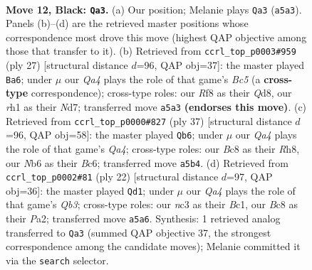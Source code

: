 \documentclass[11pt]{article}
\begin{document}
\clearpage

\begin{figure}[p]\centering
\begin{subfigure}{0.46\textwidth}\centering
\resizebox{\linewidth}{!}{%
\newchessgame
\chessboard[
  setfen={rnb2rk1/ppp2p1p/1n2p1p1/q2pP2P/1P1P1PP1/2N5/P1P5/1R1QKBNR b K - 0 12},
  showmover=false,
  pgfstyle=straightmove, color=movearrow, markmove={a5-a3}
]}
\caption{}
\end{subfigure}\hfill
\begin{subfigure}{0.46\textwidth}\centering
\resizebox{\linewidth}{!}{%
\newchessgame
\chessboard[
  setfen={r2q2k1/p1pn1r1p/1pp2pp1/2P1p3/P1b1P3/2PP1N2/5PPP/R1BQ1RK1 b - - 0 14},
  showmover=false,
  pgfstyle=straightmove, color=movearrow, markmove={c4-a6}
]}
\caption{}
\end{subfigure}
\\[4pt]
\begin{subfigure}{0.46\textwidth}\centering
\resizebox{\linewidth}{!}{%
\newchessgame
\chessboard[
  setfen={1k1r3r/1p3pp1/p1b1p2p/q1npP3/1P3P1P/P1N4R/2PQ2P1/1K1R1B2 b - - 0 19},
  showmover=false,
  pgfstyle=straightmove, color=movearrow, markmove={a5-b6}
]}
\caption{}
\end{subfigure}\hfill
\begin{subfigure}{0.46\textwidth}\centering
\resizebox{\linewidth}{!}{%
\newchessgame
\chessboard[
  setfen={rn1q1rk1/1pp1ppbp/1n4p1/4Pb2/p2P4/NQP2N2/PP2B1PP/R1B2RK1 w - - 0 12},
  showmover=false,
  pgfstyle=straightmove, color=movearrow, markmove={b3-d1}
]}
\caption{}
\end{subfigure}
\caption{\textbf{Move 12, Black: \texttt{Qa3}.} (a) Our position; Melanie plays \texttt{Qa3} (\texttt{a5a3}). Panels (b)--(d) are the retrieved master positions whose correspondence most drove this move (highest QAP objective among those that transfer to it). (b) Retrieved from \texttt{ccrl\_top\_p0003\#959} (ply 27) [structural distance $d$=96, QAP obj=37]: the master played \texttt{Ba6}; under $\mu$ our \emph{Qa4} plays the role of that game's \emph{Bc5} (a \textbf{cross-type} correspondence); cross-type roles: our \emph{R}f8 as their \emph{Q}d8, our \emph{r}h1 as their \emph{N}d7; transferred move \texttt{a5a3} \textbf{(endorses this move)}. (c) Retrieved from \texttt{ccrl\_top\_p0000\#827} (ply 37) [structural distance $d$=96, QAP obj=58]: the master played \texttt{Qb6}; under $\mu$ our \emph{Qa4} plays the role of that game's \emph{Qa4}; cross-type roles: our \emph{B}c8 as their \emph{R}h8, our \emph{N}b6 as their \emph{B}c6; transferred move \texttt{a5b4}. (d) Retrieved from \texttt{ccrl\_top\_p0002\#81} (ply 22) [structural distance $d$=97, QAP obj=36]: the master played \texttt{Qd1}; under $\mu$ our \emph{Qa4} plays the role of that game's \emph{Qb3}; cross-type roles: our \emph{n}c3 as their \emph{B}c1, our \emph{B}c8 as their \emph{P}a2; transferred move \texttt{a5a6}. Synthesis: 1 retrieved analog transferred to \texttt{Qa3} (summed QAP objective 37, the strongest correspondence among the candidate moves); Melanie committed it via the \texttt{search} selector.}
\label{fig:thought-m23}
\end{figure}
\end{document}
